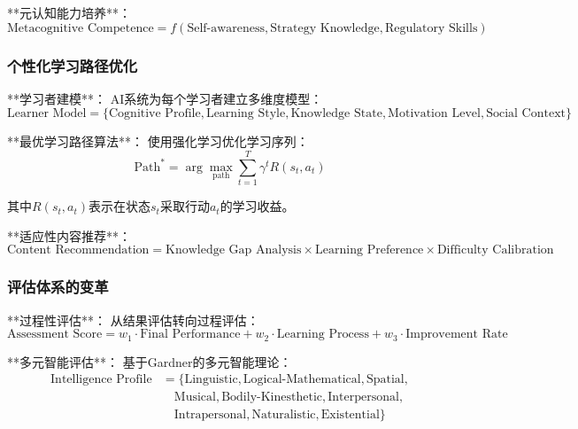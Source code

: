 **元认知能力培养**：
\begin{equation}
\text{Metacognitive Competence} = f(\text{Self-awareness}, \text{Strategy Knowledge}, \text{Regulatory Skills})
\end{equation}

\subsubsection{个性化学习路径优化} %

**学习者建模**：
AI系统为每个学习者建立多维度模型：
\begin{equation}
\text{Learner Model} = \{\text{Cognitive Profile}, \text{Learning Style}, \text{Knowledge State}, \text{Motivation Level}, \text{Social Context}\}
\end{equation}

**最优学习路径算法**：
使用强化学习优化学习序列：
\begin{equation}
\text{Path}^* = \arg\max_{\text{path}} \sum_{t=1}^T \gamma^t R(s_t, a_t)
\end{equation}

其中$R(s_t, a_t)$表示在状态$s_t$采取行动$a_t$的学习收益。

**适应性内容推荐**：
\begin{equation}
\text{Content Recommendation} = \text{Knowledge Gap Analysis} \times \text{Learning Preference} \times \text{Difficulty Calibration}
\end{equation}

\subsubsection{评估体系的变革} %

**过程性评估**：
从结果评估转向过程评估：
\begin{equation}
\text{Assessment Score} = w_1 \cdot \text{Final Performance} + w_2 \cdot \text{Learning Process} + w_3 \cdot \text{Improvement Rate}
\end{equation}

**多元智能评估**：
基于Gardner的多元智能理论：
\begin{align}
\text{Intelligence Profile} &= \{\text{Linguistic}, \text{Logical-Mathematical}, \text{Spatial}, \\
&\quad \text{Musical}, \text{Bodily-Kinesthetic}, \text{Interpersonal}, \\
&\quad \text{Intrapersonal}, \text{Naturalistic}, \text{Existential}\}
\end{align}

